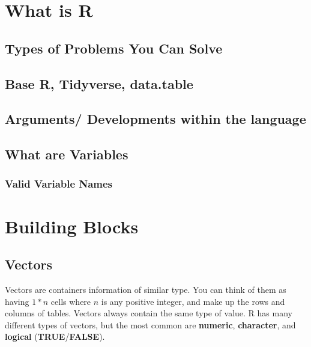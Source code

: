 \documentclass[
]{book}
\begin{document}
\hypertarget{what-is-r}{%
\chapter{What is R}\label{what-is-r}}

\hypertarget{types-of-problems-you-can-solve}{%
\section{Types of Problems You Can Solve}\label{types-of-problems-you-can-solve}}

\hypertarget{base-r-tidyverse-data.table}{%
\section{Base R, Tidyverse, data.table}\label{base-r-tidyverse-data.table}}

\hypertarget{arguments-developments-within-the-language}{%
\section{Arguments/ Developments within the language}\label{arguments-developments-within-the-language}}

\hypertarget{what-are-variables}{%
\section{What are Variables}\label{what-are-variables}}

\hypertarget{valid-variable-names}{%
\subsection{Valid Variable Names}\label{valid-variable-names}}

\hypertarget{functions}{%
\chapter{Building Blocks}\label{functions}}

\hypertarget{vectors}{%
\section{Vectors}\label{vectors}}

Vectors are containers information of similar type. You can think of them as having \(1*n\) cells where \(n\) is any positive integer, and make up the rows and columns of tables. Vectors always contain the same type of value. R has many different types of vectors, but the most common are \textbf{numeric}, \textbf{character}, and \textbf{logical} (\textbf{TRUE}/\textbf{FALSE}).
\end{document}
